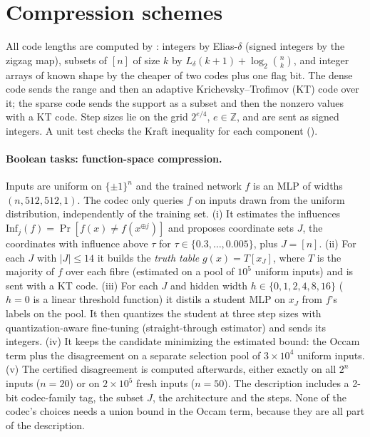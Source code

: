 \section{Compression schemes}\label{sec:methods}

All code lengths are computed by : integers by Elias-$\delta$ (signed integers by the zigzag map), subsets of $[n]$ of size $k$ by $L_\delta(k+1)+\log_2\binom nk$, and integer arrays of known shape by the cheaper of two codes plus one flag bit. The dense code sends the range and then an adaptive Krichevsky--Trofimov (KT) code over it; the sparse code sends the support as a subset and then the nonzero values with a KT code. Step sizes lie on the grid $2^{e/4}$, $e\in\mathbb Z$, and are sent as signed integers. A unit test checks the Kraft inequality for each component ().

\paragraph{Boolean tasks: function-space compression.} Inputs are uniform on $\{\pm1\}^n$ and the trained network $f$ is an MLP of widths $(n,512,512,1)$. The codec only queries $f$ on inputs drawn from the uniform distribution, independently of the training set. (i) It estimates the influences $\mathrm{Inf}_j(f)=\Pr[f(x)\ne f(x^{\oplus j})]$ and proposes coordinate sets $J$, the coordinates with influence above $\tau$ for $\tau\in\{0.3,\dots,0.005\}$, plus $J=[n]$. (ii) For each $J$ with $|J|\le14$ it builds the \emph{truth table} $g(x)=T[x_J]$, where $T$ is the majority of $f$ over each fibre (estimated on a pool of $10^5$ uniform inputs) and is sent with a KT code. (iii) For each $J$ and hidden width $h\in\{0,1,2,4,8,16\}$ ($h=0$ is a linear threshold function) it distils a student MLP on $x_J$ from $f$'s labels on the pool. It then quantizes the student at three step sizes with quantization-aware fine-tuning (straight-through estimator) and sends its integers. (iv) It keeps the candidate minimizing the estimated bound: the Occam term plus the disagreement on a separate selection pool of $3\times10^4$ uniform inputs. (v) The certified disagreement is computed afterwards, either exactly on all $2^n$ inputs ($n=20$) or on $2\times10^5$ fresh inputs ($n=50$). The description includes a 2-bit codec-family tag, the subset $J$, the architecture and the steps. None of the codec's choices needs a union bound in the Occam term, because they are all part of the description.

